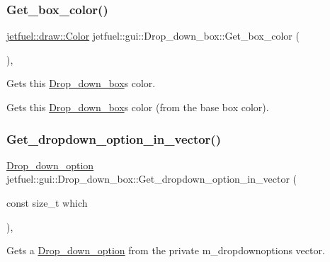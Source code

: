 \subsubsection{\texorpdfstring{Get\+\_\+box\+\_\+color()}{Get\_box\_color()}}
{\footnotesize\ttfamily \hyperlink{classjetfuel_1_1draw_1_1Color}{jetfuel\+::draw\+::\+Color} jetfuel\+::gui\+::\+Drop\+\_\+down\+\_\+box\+::\+Get\+\_\+box\+\_\+color (\begin{DoxyParamCaption}{ }\end{DoxyParamCaption})\hspace{0.3cm}{\ttfamily [inline]}, {\ttfamily [protected]}}



Gets this \hyperlink{classjetfuel_1_1gui_1_1Drop__down__box}{Drop\+\_\+down\+\_\+box}\textquotesingle{}s color. 

Gets this \hyperlink{classjetfuel_1_1gui_1_1Drop__down__box}{Drop\+\_\+down\+\_\+box}\textquotesingle{}s color (from the base box color). \mbox{\label{classjetfuel_1_1gui_1_1Drop__down__box_af6ac565eb238a27b8c988143c82cafe4}} 
\subsubsection{\texorpdfstring{Get\+\_\+dropdown\+\_\+option\+\_\+in\+\_\+vector()}{Get\_dropdown\_option\_in\_vector()}}
{\footnotesize\ttfamily \hyperlink{structjetfuel_1_1gui_1_1Drop__down__box_1_1Drop__down__option}{Drop\+\_\+down\+\_\+option} jetfuel\+::gui\+::\+Drop\+\_\+down\+\_\+box\+::\+Get\+\_\+dropdown\+\_\+option\+\_\+in\+\_\+vector (\begin{DoxyParamCaption}\item[{const size\+\_\+t}]{which }\end{DoxyParamCaption})\hspace{0.3cm}{\ttfamily [inline]}, {\ttfamily [protected]}}



Gets a \hyperlink{structjetfuel_1_1gui_1_1Drop__down__box_1_1Drop__down__option}{Drop\+\_\+down\+\_\+option} from the private m\+\_\+dropdownoptions vector. 

